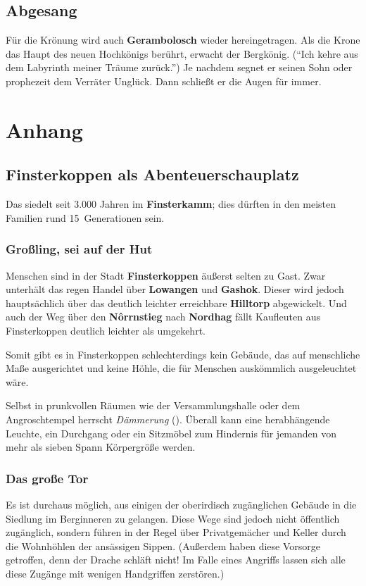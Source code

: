 \subsection{Abgesang}
Für die Krönung wird auch \textbf{Gerambolosch} wieder hereingetragen.
Als die Krone das Haupt des neuen Hochkönigs berührt, erwacht der Bergkönig. (\enquote{Ich kehre aus dem Labyrinth meiner Träume zurück.}) Je nachdem segnet er seinen Sohn oder prophezeit dem Verräter Unglück.
Dann schließt er die Augen für immer.

\spaltenende
\section{Anhang}
\spaltenanfang

\subsection{Finsterkoppen als Abenteuer\-schauplatz}
\label{hdb_anhang_finsterkoppen}

Das \fkv siedelt seit 3.000 Jahren im \textbf{Finsterkamm}; dies dürften in den meisten Familien rund 15~Generationen sein.

\subsubsection{Großling, sei auf der Hut}
Menschen sind in der Stadt \textbf{Finsterkoppen} äußerst selten zu Gast. Zwar unterhält das \fkv regen Handel über \textbf{Lowangen} und \textbf{Gashok}.
Dieser wird jedoch hauptsächlich über das deutlich leichter erreichbare \textbf{Hilltorp} abgewickelt.
Und auch der Weg über den \textbf{N\^orrnstieg} nach \textbf{Nordhag} fällt Kaufleuten aus Finsterkoppen deutlich leichter als umgekehrt.

Somit gibt es in Finsterkoppen schlechterdings kein Gebäude, das auf menschliche Maße ausgerichtet und keine Höhle, die für Menschen auskömmlich ausgeleuchtet wäre.

Selbst in prunkvollen Räumen wie der Versammlungshalle oder dem Angroschtempel herrscht \emph{Dämmerung} ().
Überall kann eine herabhängende Leuchte, ein Durchgang oder ein Sitzmöbel zum Hindernis für jemanden von mehr als sieben Spann Körpergröße werden.

\subsubsection{Das große Tor}
Es ist durchaus möglich, aus einigen der oberirdisch zugänglichen Gebäude in die Siedlung im Berginneren zu gelangen.
Diese Wege sind jedoch nicht öffentlich zugänglich, sondern führen in der Regel über Privatgemächer und Keller durch die Wohnhöhlen der ansässigen Sippen. 
(Außerdem haben diese Vorsorge getroffen, denn der Drache schläft nicht! Im Falle eines Angriffs lassen sich alle diese Zugänge mit wenigen Handgriffen zerstören.)

